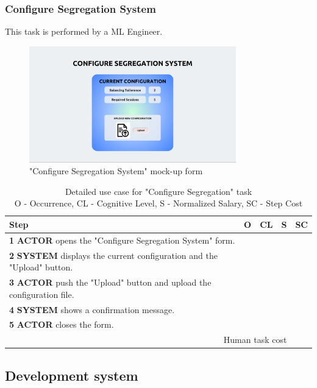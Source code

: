 \subsubsection{Configure Segregation System}
This task is performed by a ML Engineer.

\begin{figure}[H]
\centering
\includegraphics[width=0.8\textwidth]{figures/ui_configure_segregation.png}
\caption{"Configure Segregation System" mock-up form}
\end{figure}

\begin{table}[H]
\centering
\begin{tabularx}{\textwidth}{|X|c|c|c|c|}
\hline
\textbf{Step} & \textbf{O} & \textbf{CL} & \textbf{S} & \textbf{SC} \\
\hline
\textbf{1} \textbf{ACTOR} opens the "Configure Segregation System" form. &  & & & \\
\hline
\textbf{2} \textbf{SYSTEM} displays the current configuration and the "Upload" button.& & & & \\
\hline
\textbf{3} \textbf{ACTOR} push the "Upload" button and upload the configuration file. & & & &\\
\hline
\textbf{4} \textbf{SYSTEM} shows a confirmation message. & & & & \\
\hline
\textbf{5} \textbf{ACTOR} closes the form. & & & & \\
\hline
\multicolumn{4}{|r|}{Human task cost} & \\
\hline
\end{tabularx}
\caption{Detailed use case for "Configure Segregation" task\\ 
O - Occurrence, CL - Cognitive Level, S - Normalized Salary, SC - Step Cost}
\label{table:configure_segregation_system}
\end{table}
\subsection{Development system}

